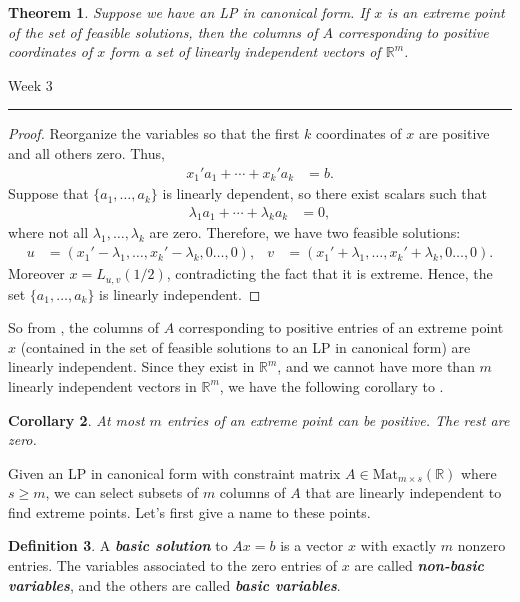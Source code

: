 \documentclass[a4paper, 12pt]{article}
\numberwithin{equation}{section}
\numberwithin{figure}{section}
\newtheorem{thm}{Theorem}[section]
\newtheorem{cor}[thm]{Corollary}
\theoremstyle{definition}
\newtheorem{defn}[thm]{Definition}
\renewcommand{\geq}{\geqslant}
\newcommand{\R}{\mathbb{R}}
\newcommand{\define}[1]{\textbf{\textit{#1}}}
\newcommand{\WEEK}[1]{%
\hfill Week #1

\vspace{-1em}

\begin{center}
	\rule{\textwidth}{2pt}
\end{center}
\vspace{0.5em}%
}
\begin{document}
\begin{thm}\label{thm:extreme-II}
	Suppose we have an LP in canonical form. If $x$ is an extreme point of the
	set of feasible solutions, then the columns of $A$ corresponding to positive
	coordinates of $x$ form a set of linearly independent vectors of
	$\mathbb{R}^m$.
\end{thm}

\WEEK{3}

\begin{proof}[Proof]
	Reorganize the variables so that the first $k$ coordinates of $x$ are positive and all others zero. Thus, 
	\begin{align*}	
		x_1'a_1 + \cdots + x_k'a_k &= b.
	\end{align*}
	Suppose that $\{a_1,\dots, a_k\}$ is linearly dependent, so there exist scalars such that 
	\begin{align*}
		\lambda_1a_1 + \cdots + \lambda_ka_k &= 0,
	\end{align*}
	where not all $\lambda_1, \dots, \lambda_k$ are zero. Therefore, we have two feasible solutions:
	\begin{align*}
		u &= (x_1' - \lambda_1, \dots, x_k' - \lambda_k, 0 \dots, 0), & v &= (x_1' + \lambda_1, \dots, x_k' + \lambda_k, 0 \dots, 0).
	\end{align*}
	Moreover $x = L_{u,v}(1/2)$, contradicting the fact that it is extreme.
	Hence, the set $\{a_1,\dots, a_k\}$ is linearly independent. 
\end{proof}

So from , the columns of $A$ corresponding to positive
entries of an extreme point $x$ (contained in the set of feasible solutions to
an LP in canonical form) are linearly independent. Since they exist in $\R^m$,
and we cannot have more than $m$ linearly independent vectors in $\R^m$, we have
the following corollary to .

\begin{cor}
	At most $m$ entries of an extreme point can be positive. The rest are zero.
\end{cor}

Given an LP in canonical form with constraint matrix $A\in \mathrm{Mat}_{m\times
s}(\R)$ where $s\geq m$, we can select subsets of $m$ columns of $A$ that are
linearly independent to find extreme points. Let's first give a name to these points.

\begin{defn}
	A \define{basic solution} to $Ax=b$ is a vector $x$ with exactly $m$ nonzero
	entries. The variables associated to the zero entries of $x$ are called
	\define{non-basic variables}, and the others are called \define{basic
	variables}.
\end{defn}
\end{document}
